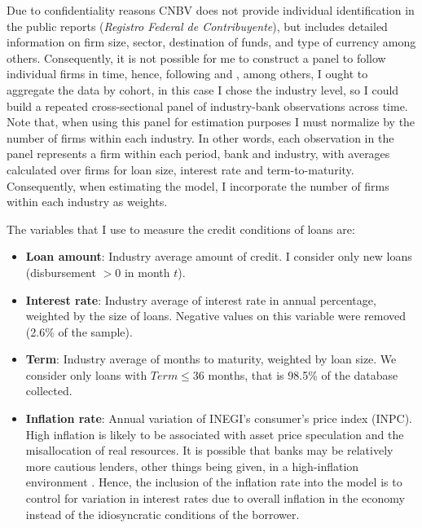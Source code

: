 \documentclass[11pt, oneside]{book}
\begin{document}
Due to confidentiality reasons CNBV does not provide individual identification in the public reports (\textit{Registro Federal de Contribuyente}), but includes detailed information on firm size, sector, destination of funds, and type of currency among others. Consequently, it is not possible for me to construct a panel to follow individual firms in time, hence, following \cite{Deaton1985109} and \cite{verbeek2008pseudo}, among others, I ought to aggregate the data by cohort, in this case I chose the industry level, so I could build a repeated cross-sectional panel of industry-bank observations across time. Note that, when using this panel for estimation purposes I must normalize by the number of firms within each industry. In other words, each observation in the panel represents a firm within each period, bank and industry, with averages calculated over firms for loan size, interest rate and term-to-maturity. Consequently, when estimating the model, I incorporate the number of firms within each industry as weights.


The variables that I use to measure the credit conditions of loans are:

\begin{itemize}
	\item \textbf{Loan amount}: Industry average amount of credit. I consider only new loans (disbursement $> 0$ in month $t$).
	\item \textbf{Interest rate}: Industry average of interest rate in annual percentage, weighted by the size of loans. Negative values on this variable were removed (2.6\% of the sample).
	\item \textbf{Term}: Industry average of months to maturity, weighted by loan size. We consider only loans with $Term \leq 		36$ months, that is 98.5\% of the database collected.
\item \textbf{Inflation rate}: Annual variation of  INEGI's consumer's price index (INPC). High inflation is likely to be associated with asset price speculation and the misallocation of real resources. It is possible that banks may be relatively more cautious lenders, other things being given, in a high-inflation environment \citep{blundell1992credit}. Hence, the inclusion of the inflation rate into the model is to control for variation in interest rates due to overall inflation in the economy instead of the idiosyncratic conditions of the borrower. \end{itemize}
\end{document}
